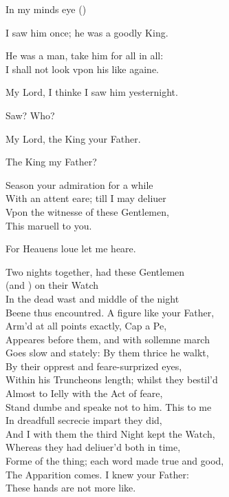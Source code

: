 \documentclass[a5paper,DIV=calc,11pt]{scrbook}
\begin{document}
\begin{drama*}
    \hamspeaks In my minds eye (\hor)\
    
    \horspeaks I saw him once; he was a goodly King.
    
    \hamspeaks He was a man, take him for all in all:\\
    I shall not look vpon his like againe.
    
    \horspeaks My Lord, I thinke I saw him yesternight.
    
    \hamspeaks Saw? Who?
    
    \horspeaks My Lord, the King your Father.
    
    \hamspeaks The King my Father?
    
    \horspeaks Season your admiration for a while\\
    With an attent eare; till I may deliuer\\
    Vpon the witnesse of these Gentlemen,\\
    This maruell to you.
    
    \hamspeaks For Heauens loue let me heare.
    
    \horspeaks Two nights together, had these Gentlemen\\
    (\mar and \barn) on their Watch\\
    In the dead wast and middle of the night\\
    Beene thus encountred. A figure like your Father,\\
    Arm'd at all points exactly, Cap a Pe,\\
    Appeares before them, and with sollemne march\\
    Goes slow and stately: By them thrice he walkt,\\
    By their opprest and feare-surprized eyes,\\
    Within his Truncheons length; whilst they bestil'd\\
    Almost to Ielly with the Act of feare,\\
    Stand dumbe and speake not to him. This to me\\
    In dreadfull secrecie impart they did,\\
    And I with them the third Night kept the Watch,\\
    Whereas they had deliuer'd both in time,\\
    Forme of the thing; each word made true and good,\\
    The Apparition comes. I knew your Father:\\
    These hands are not more like.
    

\end{drama*}
\end{document}
